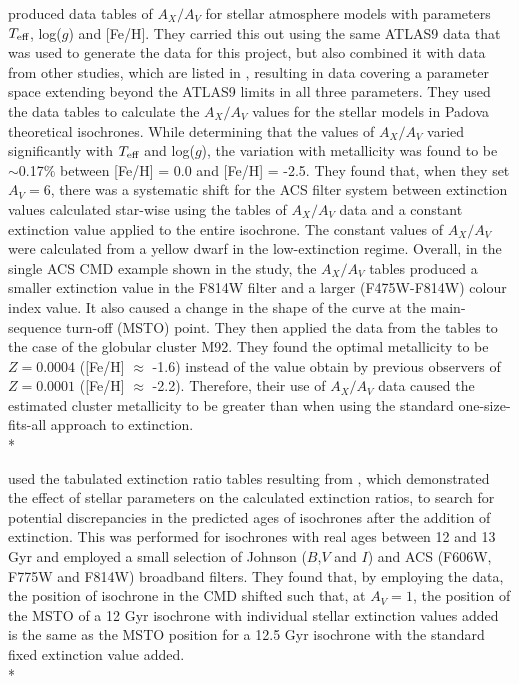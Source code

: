 \documentclass[12pt, a4paper]{report}
\begin{document}
\cite{2008PASP..120..583G} produced data tables of $A_{X}/A_{V}$ for stellar atmosphere models with parameters $T_{\textnormal{eff}}$, log($g$) and [Fe/H]. They carried this out using the same ATLAS9 data \citep{2004astro.ph..5087C} that was used to generate the data for this project, but also combined it with data from other studies, which are listed in \cite{2002A&A...391..195G}, resulting in data covering a parameter space extending beyond the ATLAS9 limits in all three parameters. They used the data tables to calculate the $A_{X}/A_{V}$ values for the stellar models in Padova theoretical isochrones. While determining that the values of $A_{X}/A_{V}$ varied significantly with $T_{\textnormal{eff}}$ and log($g$), the variation with metallicity was found to be $\sim$0.17$\%$ between [Fe/H] = 0.0 and [Fe/H] = -2.5. They found that, when they set $A_{V} = 6$, there was a systematic shift for the ACS filter system between extinction values calculated star-wise using the tables of $A_{X}/A_{V}$ data and a constant extinction value applied to the entire isochrone. The constant values of $A_{X}/A_{V}$ were calculated from a yellow dwarf in the low-extinction regime. Overall, in the single ACS CMD example shown in the study, the $A_{X}/A_{V}$ tables produced a smaller extinction value in the F814W filter and a larger (F475W-F814W) colour index value. It also caused a change in the shape of the curve at the main-sequence turn-off (MSTO) point. They then applied the data from the tables to the case of the globular cluster M92. They found the optimal metallicity to be $Z = 0.0004$ ([Fe/H] $\approx$ -1.6) instead of the value obtain by previous observers of $Z = 0.0001$ ([Fe/H] $\approx$ -2.2). Therefore, their use of $A_{X}/A_{V}$ data caused the estimated cluster metallicity to be greater than when using the standard one-size-fits-all approach to extinction.\\*

\cite{2017Galax...5...28O} used the tabulated extinction ratio tables resulting from \cite{2008PASP..120..583G}, which demonstrated the effect of stellar parameters on the calculated extinction ratios, to search for potential discrepancies in the predicted ages of isochrones after the addition of extinction. This was performed for isochrones with real ages between 12 and 13 Gyr and employed a small selection of Johnson ($B$,$V$ and $I$) and ACS (F606W, F775W and F814W) broadband filters. They found that, by employing the \cite{2008PASP..120..583G} data, the position of isochrone in the CMD shifted such that, at $A_{V} = 1$, the position of the MSTO of a 12 Gyr isochrone with individual stellar extinction values added is the same as the MSTO position for a 12.5 Gyr isochrone with the standard fixed extinction value added.\\*
\end{document}
